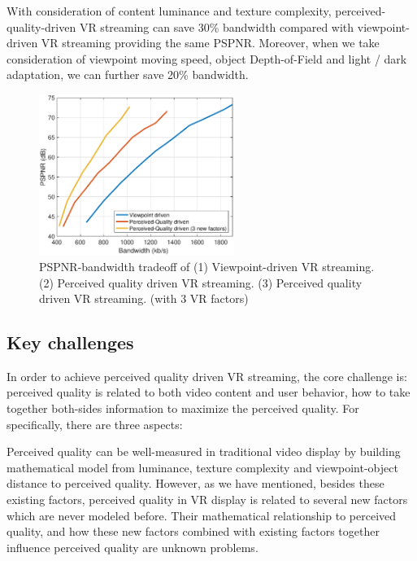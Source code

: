 With consideration of content luminance and texture complexity, perceived-quality-driven VR streaming can save 30\% bandwidth compared with viewpoint-driven VR streaming providing the same PSPNR. Moreover, when we take consideration of viewpoint moving speed, object Depth-of-Field and light / dark adaptation, we can further save 20\% bandwidth.


\begin{figure}
  \centering
  \includegraphics[width=2.5in]{images/improvement.eps}
  \caption{PSPNR-bandwidth tradeoff of (1) Viewpoint-driven VR streaming. (2) Perceived quality driven VR streaming. (3) Perceived quality driven VR streaming. (with 3 VR factors)}
  \label{potential1}
  \end{figure}




\subsection{Key challenges}
In order to achieve perceived quality driven VR streaming, the core challenge is: perceived quality is related to both video content and user behavior, how to take together both-sides information to maximize the perceived quality. For specifically, there are three aspects:

Perceived quality can be well-measured in traditional video display by building mathematical model from luminance, texture complexity and viewpoint-object distance to perceived quality. However, as we have mentioned, besides these existing factors, perceived quality in VR display is related to several new factors which are never modeled before. Their mathematical relationship to perceived quality, and how these new factors combined with existing factors together influence perceived quality are unknown problems.

